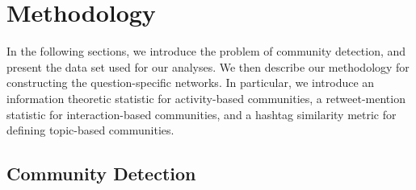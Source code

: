 \section{Methodology}
\DIFdelbegin %

\DIFdelend In the following sections, we introduce the problem of community detection, and present the data set used for our analyses. We then describe our methodology for constructing the question-specific networks. In particular, we introduce an information theoretic statistic for activity-based communities, a retweet-mention statistic for interaction-based communities, and a hashtag similarity metric for defining topic-based communities. \DIFaddbegin {}\emph{}\DIFaddend 

\subsection{Community Detection}

